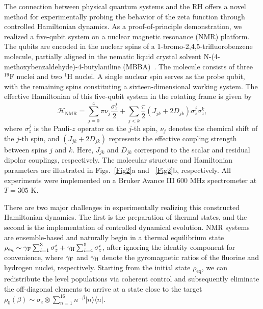 \documentclass[aps,pra,twocolumn,superscriptaddress,preprintnumbers,amsmath,amssymb]{revtex4-2}
\begin{document}
The connection between physical quantum systems and the RH offers a novel method for experimentally probing the behavior of the zeta function through controlled  Hamiltonian dynamics. As a proof-of-principle demonstration, we realized a five-qubit system on a nuclear magnetic resonance (NMR) platform. The qubits are encoded in the nuclear spins of a 1-bromo-2,4,5-trifluorobenzene molecule, partially aligned in the nematic liquid crystal solvent N-(4-methoxybenzaldehyde)-4-butylaniline (MBBA)~\cite{exp1,exp2,exp3}. The molecule consists of three ${}^{19}\mathrm{F}$ nuclei and two ${}^{1}\mathrm{H}$ nuclei. A single nuclear spin serves as the probe qubit, with the remaining spins constituting a sixteen-dimensional working system. The effective Hamiltonian of this five-qubit system in the rotating frame is given by
\begin{equation}
\mathcal{H}_{\mathrm{NMR}} = \sum_{j=0}^{4} \pi \nu_j \frac{\sigma_z^{j}}{2}+\sum_{j<k} \frac{\pi}{2} \left( J_{jk} + 2D_{jk} \right) \sigma_z^{j} \sigma_z^{k},
\label{eq:nmr_hamiltonian}
\end{equation}
where $\sigma_z^{j}$ is the Pauli-$z$ operator on the $j$-th spin, $\nu_j$ denotes the chemical shift of the $j$-th spin, and $(J_{jk} + 2D_{jk})$ represents the effective coupling strength between spins $j$ and $k$. Here, $J_{jk}$ and $D_{jk}$ correspond to the scalar and residual dipolar couplings, respectively. The molecular structure and Hamiltonian parameters are illustrated in Figs.~\ref{Fig2}a and ~\ref{Fig2}b, respectively. All experiments were implemented on a Bruker Avance III 600 MHz spectrometer at $T = 305$ K. 


There are two major challenges in experimentally realizing this constructed Hamiltonian dynamics. The first is the preparation of thermal states, and the second is the implementation of controlled dynamical evolution. NMR systems are ensemble-based and naturally begin in a thermal equilibrium state \(\rho_{\mathrm{eq}} \sim \gamma_{\rm F}\sum_{i=1}^3\sigma_z^{i}+\gamma_{\rm H}\sum_{i=4}^5\sigma_z^{i}\), after ignoring the identity component for convenience, where $\gamma_{\rm F}$ and $\gamma_{\rm H}$ denote the gyromagnetic ratios of the fluorine and hydrogen nuclei, respectively. Starting from the initial state $\rho_{\mathrm{eq}}$, we can redistribute  the level populations via coherent control and subsequently eliminate the off-diagonal elements to arrive at a state close to the target $\rho_{0}(\beta) \sim \sigma_z \otimes \sum_{n=1}^{16} n^{-\beta} |n\rangle\langle n|$. 
\end{document}
